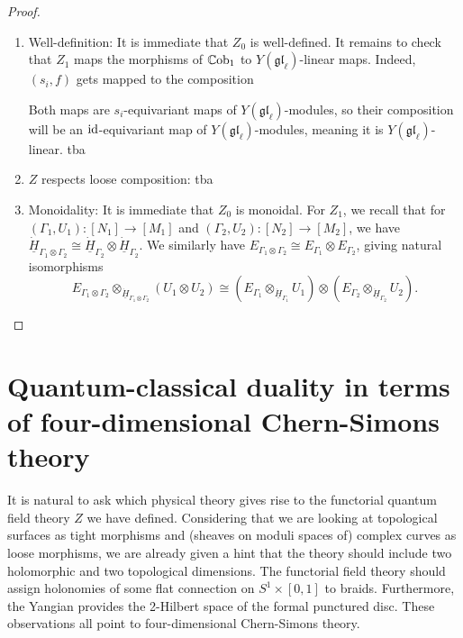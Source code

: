 \documentclass[11pt]{report}
\theoremstyle{definition}
\theoremstyle{remark}
\theoremstyle{remark}
\newcommand{\id}{\textnormal{id}}
\begin{document}
\begin{proof}
\begin{enumerate}[label=(\roman*)]
\item Well-definition: It is immediate that $Z_0$ is well-defined. It remains to check that $Z_1$ maps the morphisms of $\mathbb{C}\textnormal{ob}_1$ to $Y(\mathfrak{gl}_\ell)$-linear maps. Indeed, $(s_i,f)$ gets mapped to the composition
\begin{center}
\end{center}
Both maps are $s_i$-equivariant maps of $Y(\mathfrak{gl}_\ell)$-modules, so their composition will be an $\id$-equivariant map of $Y(\mathfrak{gl}_\ell)$-modules, meaning it is $Y(\mathfrak{gl}_\ell)$-linear. tba
\item $Z$ respects loose composition: tba
\item Monoidality: It is immediate that $Z_0$ is monoidal. For $Z_1$, we recall that for $(\Gamma_1,U_1): [N_1] \to [M_1]$ and $(\Gamma_2,U_2):[N_2] \to [M_2]$, we have $\underline{\dot H}_{\Gamma_1 \otimes \Gamma_2} \cong \underline{\dot H}_{\Gamma_2} \otimes \underline{\dot H}_{\Gamma_2}$. We similarly have $E_{\Gamma_1 \otimes \Gamma_2} \cong E_{\Gamma_1} \otimes E_{\Gamma_2}$, giving natural isomorphisms
\begin{equation*}
E_{\Gamma_1 \otimes \Gamma_2} \otimes_{\underline{\dot H}_{\Gamma_1 \otimes \Gamma_2}} (U_1 \otimes U_2) \cong (E_{\Gamma_1} \otimes_{\underline{\dot H}_{\Gamma_1}} U_1) \otimes (E_{\Gamma_2} \otimes_{\underline{\dot H}_{\Gamma_2}} U_2).
\end{equation*}
\end{enumerate}
\end{proof}

\section{Quantum-classical duality in terms of four-dimensional Chern-Simons theory}

It is natural to ask which physical theory gives rise to the functorial quantum field theory $Z$ we have defined. Considering that we are looking at topological surfaces as tight morphisms and (sheaves on moduli spaces of) complex curves as loose morphisms, we are already given a hint that the theory should include two holomorphic and two topological dimensions. The functorial field theory should assign holonomies of some flat connection on $S^1 \times [0,1]$ to braids. Furthermore, the Yangian provides the 2-Hilbert space of the formal punctured disc. These observations all point to four-dimensional Chern-Simons theory.
\end{document}

